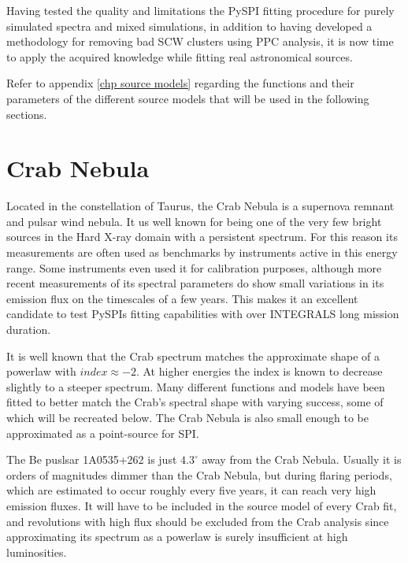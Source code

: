 \documentclass{report}
\begin{document}
Having tested the quality and limitations the PySPI fitting procedure for purely simulated spectra and mixed simulations, in addition to having developed a methodology for removing bad SCW clusters using PPC analysis, it is now time to apply the acquired knowledge while fitting real astronomical sources.

Refer to appendix \ref{chp source models} regarding the functions and their parameters of the different source models that will be used in the following sections.

\section{Crab Nebula}
Located in the constellation of Taurus, the Crab Nebula is a supernova remnant and pulsar wind nebula. It us well known for being one of the very few bright sources in the Hard X-ray domain with a persistent spectrum. For this reason its measurements are often used as benchmarks by instruments active in this energy range. Some instruments even used it for calibration purposes, although more recent measurements of its spectral parameters do show small variations in its emission flux on the timescales of a few years. This makes it an excellent candidate to test PySPIs fitting capabilities with over INTEGRALS long mission duration.

It is well known that the Crab spectrum matches the approximate shape of a powerlaw with $index\approx-2$. At higher energies the index is known to decrease slightly to a steeper spectrum. Many different functions and models have been fitted to better match the Crab's spectral shape with varying success, some of which will be recreated below. The Crab Nebula is also small enough to be approximated as a point-source for SPI.

The Be puslsar 1A0535+262 is just $4.3^\circ$ away from the Crab Nebula. Usually it is orders of magnitudes dimmer than the Crab Nebula, but during flaring periods, which are estimated to occur roughly every five years, it can reach very high emission fluxes. It will have to be included in the source model of every Crab fit, and revolutions with high flux should be excluded from the Crab analysis since approximating its spectrum as a powerlaw is surely insufficient at high luminosities. 
\end{document}
